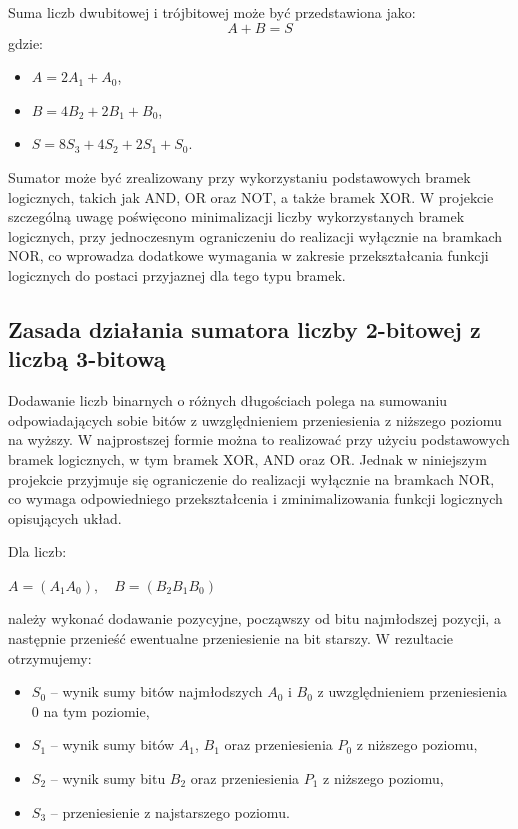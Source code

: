 \documentclass[11pt]{article}
\begin{document}
Suma liczb dwubitowej i trójbitowej może być przedstawiona jako:
\begin{equation}
A + B = S
\end{equation}
gdzie:
\begin{itemize}
    \item \(A = 2A_1 + A_0\),
    \item \(B = 4B_2 + 2B_1 + B_0\),
    \item \(S = 8S_3 + 4S_2 + 2S_1 + S_0\).
\end{itemize}

Sumator może być zrealizowany przy wykorzystaniu podstawowych bramek logicznych, takich jak AND, OR oraz NOT, a także bramek XOR. W projekcie szczególną uwagę poświęcono minimalizacji liczby wykorzystanych bramek logicznych, przy jednoczesnym ograniczeniu do realizacji wyłącznie na bramkach NOR, co wprowadza dodatkowe wymagania w zakresie przekształcania funkcji logicznych do postaci przyjaznej dla tego typu bramek.

\subsection{Zasada działania sumatora liczby 2-bitowej z liczbą 3-bitową}

Dodawanie liczb binarnych o różnych długościach polega na sumowaniu odpowiadających sobie bitów z uwzględnieniem przeniesienia z niższego poziomu na wyższy. W najprostszej formie można to realizować przy użyciu podstawowych bramek logicznych, w tym bramek XOR, AND oraz OR. Jednak w niniejszym projekcie przyjmuje się ograniczenie do realizacji wyłącznie na bramkach NOR, co wymaga odpowiedniego przekształcenia i zminimalizowania funkcji logicznych opisujących układ.

Dla liczb:
\begin{center}
$A = (A_1 A_0),\quad B = (B_2 B_1 B_0)$
\end{center}
należy wykonać dodawanie pozycyjne, począwszy od bitu najmłodszej pozycji, a następnie przenieść ewentualne przeniesienie na bit starszy. W rezultacie otrzymujemy:
\begin{itemize}
    \item \(S_0\) -- wynik sumy bitów najmłodszych \(A_0\) i \(B_0\) z uwzględnieniem przeniesienia 0 na tym poziomie,
    \item \(S_1\) -- wynik sumy bitów \(A_1\), \(B_1\) oraz przeniesienia \(P_0\) z niższego poziomu,
    \item \(S_2\) -- wynik sumy bitu \(B_2\) oraz przeniesienia \(P_1\) z niższego poziomu,
    \item \(S_3\) -- przeniesienie z najstarszego poziomu.
\end{itemize}
\end{document}
